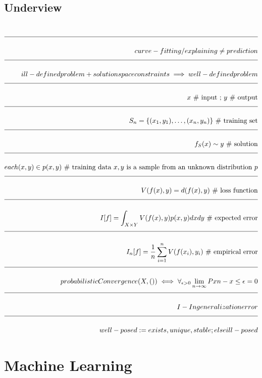 \documentclass[a4paper]{article}
\newcommand{\eqComment}[1]{\text{  \# #1}}
\newcommand{\eqSep}{\text{ ;  }}
\newcommand{\n}{\\[1.5ex] \hline \nonumber \\[0ex]}
\begin{document}
\subsection{Underview}
\begin{tcolorbox}
\begin{align}
\n curve-fitting / explaining \neq prediction
\n ill-defined problem + solution space constraints \implies well-defined problem
\n x \eqComment{input} \eqSep y \eqComment{output}
\n S_n = \{(x_1, y_1), \ldots, (x_n, y_n)\} \eqComment{training set}
\n f_S(x) \sim y \eqComment{solution}
\n each (x,y) \in p(x, y) \eqComment{training data $x, y$ is a sample from an unknown distribution $p$}
\n V(f(x), y) = d(f(x), y) \eqComment{loss function}
\n I[f] = \int_{X \times Y}{V(f(x), y) p(x, y) dx dy} \eqComment{expected error}
\n I_n[f] = \frac{1}{n} \sum_{i=1}^{n}{V(f(x_i), y_i)} \eqComment{empirical error}
\n probabilisticConvergence(X, ()) \iff \forall_{\epsilon > 0} \lim_{n \to \infty}{P{xn - x} \leq \epsilon} = 0
\n I - In generalization error
\n well-posed := exists, unique, stable ; else ill-posed
\end{align}
\end{tcolorbox}

\section{Machine Learning}
\end{document}
